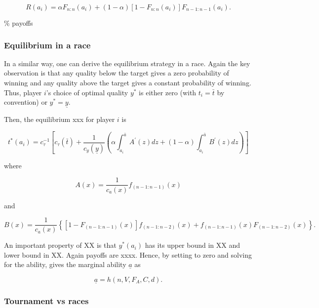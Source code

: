 \documentclass[10pt, titlepage]{article}
\newcommand\deadline{\bar{t}}
\newcommand\target{\underline{y}}
\newcommand\ctime{c_{\tau}}
\newcommand\cscore{c_{y}}
\newcommand\hitype{\bar{a}}
\begin{document}
\begin{equation} 
    R(a_i) = \alpha F_{n:n}(a_i) + (1-\alpha)[1-F_{n:n}(a_i)] F_{n-1:n-1}(a_i).
\end{equation}

\% payoffs

\subsubsection{Equilibrium in a race}\label{equilibrium-in-a-race}

In a similar way, one can derive the equilibrium strategy in a race.
Again the key observation is that any quality below the target gives a
zero probability of winning and any quality above the target gives a
constant probability of winning. Thus, player \(i\)'s choice of optimal
quality \(y^*\) is either zero (with \(t_i=\deadline\) by convention) or
\(y^*=\target\).

Then, the equilibrium xxx for player \(i\) is

\begin{equation} \label{tstar}
t^*(a_i) = 
    \ctime^{-1}
    \left[\ctime(\deadline) 
    + \frac{1}{\cscore(\target)}
    \left(\alpha \int_{a_i}^{\hitype} A^\prime(z) dz
      + (1-\alpha) \int_{a_i}^{\hitype} B^\prime(z)  dz
    \right)
    \right]
\end{equation}

where

\begin{equation}
  A(x) = \frac{1}{c_{a}(x)} f_{(n-1:n-1)}(x)
\end{equation}

and

\begin{equation}
    B(x) = \frac{1}{c_{a}(x)} \left\{
            \left[1- F_{(n-1:n-1)}(x)\right]f_{(n-1:n-2)}(x)
            + f_{(n-1:n-1)}(x) F_{(n-1:n-2)}(x)
    \right\}.
\end{equation}

An important property of XX is that \(y^*(a_i)\) has its upper bound in
XX and lower bound in XX. Again payoffs are xxxx. Hence, by setting to
zero and solving for the ability, gives the marginal ability
\({\underline a}\) as

\begin{equation}
  {\underline a}= h(n, V, F_A, C, d).
\end{equation}

\subsubsection{Tournament vs races}\label{tournament-vs-races}
\end{document}
